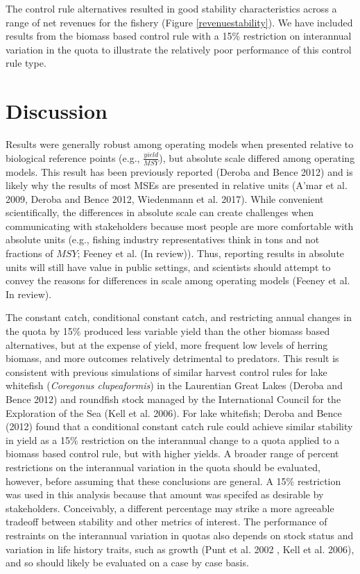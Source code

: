 \documentclass[]{article}
\begin{document}
The control rule alternatives resulted in good stability characteristics
across a range of net revenues for the fishery (Figure
\ref{revenuestability}). We have included results from the biomass based
control rule with a 15\% restriction on interannual variation in the
quota to illustrate the relatively poor performance of this control rule
type.

\section{Discussion}\label{discussion}

Results were generally robust among operating models when presented
relative to biological reference points (e.g., \(\frac{yield}{MSY}\)),
but absolute scale differed among operating models. This result has been
previously reported (Deroba and Bence 2012) and is likely why the
results of most MSEs are presented in relative units (A'mar et al. 2009,
Deroba and Bence 2012, Wiedenmann et al. 2017). While convenient
scientifically, the differences in absolute scale can create challenges
when communicating with stakeholders because most people are more
comfortable with absolute units (e.g., fishing industry representatives
think in tons and not fractions of \(MSY\); Feeney et al. (In review)).
Thus, reporting results in absolute units will still have value in
public settings, and scientists should attempt to convey the reasons for
differences in scale among operating models (Feeney et al. In review).

The constant catch, conditional constant catch, and restricting annual
changes in the quota by 15\% produced less variable yield than the other
biomass based alternatives, but at the expense of yield, more frequent
low levels of herring biomass, and more outcomes relatively detrimental
to predators. This result is consistent with previous simulations of
similar harvest control rules for lake whitefish (\emph{Coregonus
clupeaformis}) in the Laurentian Great Lakes (Deroba and Bence 2012) and
roundfish stock managed by the International Council for the Exploration
of the Sea (Kell et al. 2006). For lake whitefish; Deroba and Bence
(2012) found that a conditional constant catch rule could achieve
similar stability in yield as a 15\% restriction on the interannual
change to a quota applied to a biomass based control rule, but with
higher yields. A broader range of percent restrictions on the
interannual variation in the quota should be evaluated, however, before
assuming that these conclusions are general. A 15\% restriction was used
in this analysis because that amount was specifed as desirable by
stakeholders. Conceivably, a different percentage may strike a more
agreeable tradeoff between stability and other metrics of interest. The
performance of restraints on the interannual variation in quotas also
depends on stock status and variation in life history traits, such as
growth (Punt et al. 2002 , Kell et al. 2006), and so should likely be
evaluated on a case by case basis.
\end{document}
